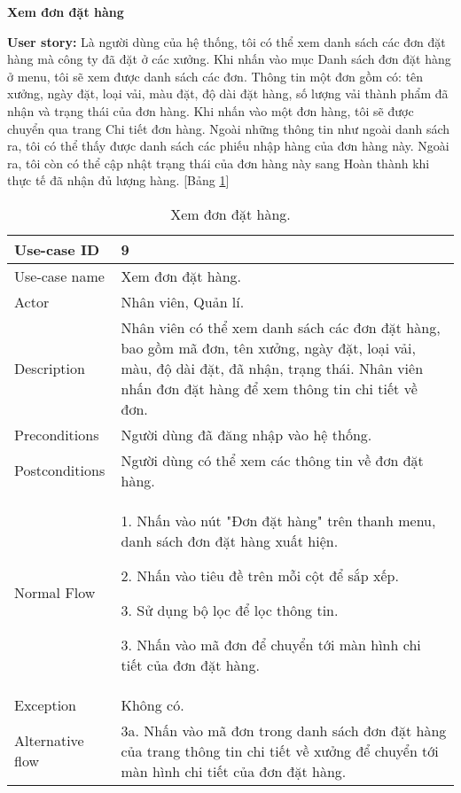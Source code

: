 \textbf{Xem đơn đặt hàng}\par
\textbf{User story:} Là người dùng của hệ thống, tôi có thể xem danh sách các đơn đặt hàng mà công ty đã đặt ở các xưởng. Khi nhấn vào mục Danh sách đơn đặt hàng ở menu, tôi sẽ xem được danh sách các đơn. Thông tin một đơn gồm có: tên xưởng, ngày đặt, loại vải, màu đặt, độ dài đặt hàng, số lượng vải thành phẩm đã nhận và trạng thái của đơn hàng. Khi nhấn vào một đơn hàng, tôi sẽ được chuyển qua trang Chi tiết đơn hàng. Ngoài những thông tin như ngoài danh sách ra, tôi có thể thấy được danh sách các phiếu nhập hàng của đơn hàng này. Ngoài ra, tôi còn có thể cập nhật trạng thái của đơn hàng này sang Hoàn thành khi thực tế đã nhận đủ lượng hàng. [Bảng \ref{bang6}]
\begin{table}[H]
    \centering
    \begin{tabular}{|m{3cm}|m{10cm}|}
    \hline 
        Use-case ID & 9\\ \hline
        Use-case name & Xem đơn đặt hàng.\\ \hline
        Actor & Nhân viên, Quản lí.\\ \hline
        Description & Nhân viên có thể xem danh sách các đơn đặt hàng, bao gồm mã đơn, tên xưởng, ngày đặt, loại vải, màu, độ dài đặt, đã nhận, trạng thái. Nhân viên nhấn đơn đặt hàng để xem thông tin chi tiết về đơn.\\ \hline
        Preconditions & Người dùng đã đăng nhập vào hệ thống.\\ \hline
        Postconditions & Người dùng có thể xem các thông tin về đơn đặt hàng.\\ \hline
        Normal Flow & 
        1. Nhấn vào nút "Đơn đặt hàng" trên thanh menu, danh sách đơn đặt hàng xuất hiện.\par
        2. Nhấn vào tiêu đề trên mỗi cột để sắp xếp.\par
        3. Sử dụng bộ lọc để lọc thông tin.\par
        3. Nhấn vào mã đơn để chuyển tới màn hình chi tiết của đơn đặt hàng.
        \\ \hline
        Exception & Không có.\\ \hline
        Alternative flow & 
        3a. Nhấn vào mã đơn trong danh sách đơn đặt hàng của trang thông tin chi tiết về xưởng để chuyển tới màn hình chi tiết của đơn đặt hàng.
        \\ 
    \hline 
    \end{tabular}
    \caption{Xem đơn đặt hàng.}
    \label{bang6}
\end{table}


